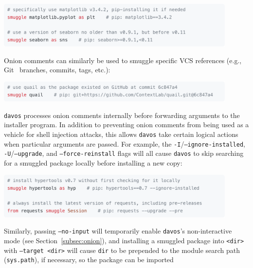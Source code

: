 \documentclass[preprint,12pt,a4paper]{elsarticle}
\begin{document}
\begin{center}
\includegraphics[width=0.9\textwidth]{figs/snippet3}
\end{center}
Onion comments can similarly be used to smuggle specific VCS references (e.g., Git~\cite{TorvHama05}  branches, commits, tags, etc.):
\begin{center}
\includegraphics[width=0.9\textwidth]{figs/snippet4}
\end{center}
\texttt{davos} processes onion comments internally before forwarding arguments to the installer program. In addition to preventing onion comments from being used as a vehicle for shell injection attacks, this allows \texttt{davos} take certain logical actions when particular arguments are passed. For example, the \texttt{-I}/\texttt{--ignore-installed}, \texttt{-U}/\texttt{--upgrade}, and \texttt{--force-reinstall} flags will all cause \texttt{davos} to skip searching for a smuggled package locally before installing a new copy:
\begin{center}
\includegraphics[width=0.9\textwidth]{figs/snippet5}
\end{center}
Similarly, passing \texttt{--no-input} will temporarily enable \texttt{davos}'s non-interactive mode (see Section~\ref{subsec:onion}), and installing a smuggled package into \texttt{<dir>} with \texttt{--target <dir>} will cause \texttt{dir} to be prepended to the module search path (\texttt{sys.path}), if necessary, so the package can be imported
\end{document}
